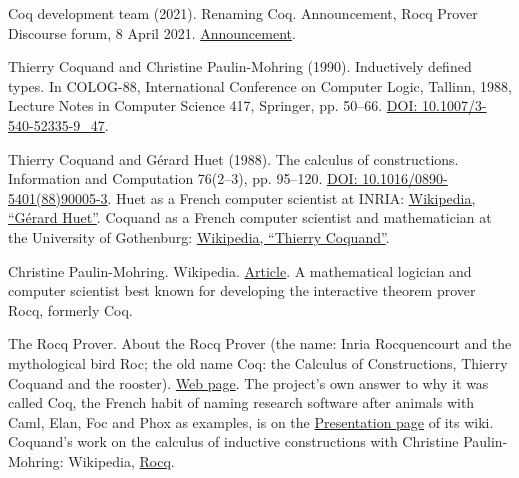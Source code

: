 \noindent Coq development team (2021). Renaming Coq. Announcement, Rocq Prover Discourse forum, 8 April 2021. \href{https://discourse.rocq-prover.org/t/renaming-coq/1264}{Announcement}.
\par\medskip

\noindent Thierry Coquand and Christine Paulin-Mohring (1990). Inductively defined types. In COLOG-88, International Conference on Computer Logic, Tallinn, 1988, Lecture Notes in Computer Science 417, Springer, pp. 50--66. \href{https://doi.org/10.1007/3-540-52335-9_47}{DOI: 10.1007/3-540-52335-9\_47}.
\par\medskip

\noindent Thierry Coquand and G\'erard Huet (1988). The calculus of constructions. Information and Computation 76(2--3), pp. 95--120. \href{https://doi.org/10.1016/0890-5401(88)90005-3}{DOI: 10.1016/0890-5401(88)90005-3}. Huet as a French computer scientist at INRIA: \href{https://en.wikipedia.org/wiki/G\%C3\%A9rard_Huet}{Wikipedia, ``G\'erard Huet''}. Coquand as a French computer scientist and mathematician at the University of Gothenburg: \href{https://en.wikipedia.org/wiki/Thierry_Coquand}{Wikipedia, ``Thierry Coquand''}.
\par\medskip

\noindent Christine Paulin-Mohring. Wikipedia. \href{https://en.wikipedia.org/wiki/Christine_Paulin-Mohring}{Article}. A mathematical logician and computer scientist best known for developing the interactive theorem prover Rocq, formerly Coq.
\par\medskip

\noindent The Rocq Prover. About the Rocq Prover (the name: Inria Rocquencourt and the mythological bird Roc; the old name Coq: the Calculus of Constructions, Thierry Coquand and the rooster). \href{https://rocq-prover.org/about}{Web page}. The project's own answer to why it was called Coq, the French habit of naming research software after animals with Caml, Elan, Foc and Phox as examples, is on the \href{https://github.com/coq/coq/wiki/Presentation}{Presentation page} of its wiki. Coquand's work on the calculus of inductive constructions with Christine Paulin-Mohring: Wikipedia, \href{https://en.wikipedia.org/wiki/Rocq}{Rocq}.
\par\medskip
